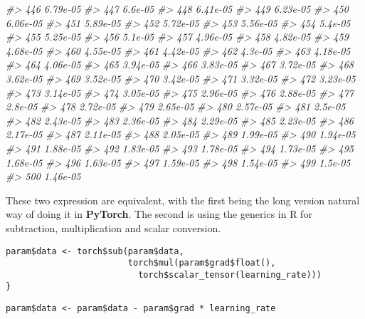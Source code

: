 \documentclass[]{book}
\newenvironment{Shaded}{\begin{snugshade}}{\end{snugshade}}
\newcommand{\CommentTok}[1]{\textcolor[rgb]{0.56,0.35,0.01}{\textit{#1}}}
\begin{document}
\begin{Shaded}
\begin{Highlighting}[]
\CommentTok{#> 446  6.79e-05 }
\CommentTok{#> 447  6.6e-05 }
\CommentTok{#> 448  6.41e-05 }
\CommentTok{#> 449  6.23e-05 }
\CommentTok{#> 450  6.06e-05 }
\CommentTok{#> 451  5.89e-05 }
\CommentTok{#> 452  5.72e-05 }
\CommentTok{#> 453  5.56e-05 }
\CommentTok{#> 454  5.4e-05 }
\CommentTok{#> 455  5.25e-05 }
\CommentTok{#> 456  5.1e-05 }
\CommentTok{#> 457  4.96e-05 }
\CommentTok{#> 458  4.82e-05 }
\CommentTok{#> 459  4.68e-05 }
\CommentTok{#> 460  4.55e-05 }
\CommentTok{#> 461  4.42e-05 }
\CommentTok{#> 462  4.3e-05 }
\CommentTok{#> 463  4.18e-05 }
\CommentTok{#> 464  4.06e-05 }
\CommentTok{#> 465  3.94e-05 }
\CommentTok{#> 466  3.83e-05 }
\CommentTok{#> 467  3.72e-05 }
\CommentTok{#> 468  3.62e-05 }
\CommentTok{#> 469  3.52e-05 }
\CommentTok{#> 470  3.42e-05 }
\CommentTok{#> 471  3.32e-05 }
\CommentTok{#> 472  3.23e-05 }
\CommentTok{#> 473  3.14e-05 }
\CommentTok{#> 474  3.05e-05 }
\CommentTok{#> 475  2.96e-05 }
\CommentTok{#> 476  2.88e-05 }
\CommentTok{#> 477  2.8e-05 }
\CommentTok{#> 478  2.72e-05 }
\CommentTok{#> 479  2.65e-05 }
\CommentTok{#> 480  2.57e-05 }
\CommentTok{#> 481  2.5e-05 }
\CommentTok{#> 482  2.43e-05 }
\CommentTok{#> 483  2.36e-05 }
\CommentTok{#> 484  2.29e-05 }
\CommentTok{#> 485  2.23e-05 }
\CommentTok{#> 486  2.17e-05 }
\CommentTok{#> 487  2.11e-05 }
\CommentTok{#> 488  2.05e-05 }
\CommentTok{#> 489  1.99e-05 }
\CommentTok{#> 490  1.94e-05 }
\CommentTok{#> 491  1.88e-05 }
\CommentTok{#> 492  1.83e-05 }
\CommentTok{#> 493  1.78e-05 }
\CommentTok{#> 494  1.73e-05 }
\CommentTok{#> 495  1.68e-05 }
\CommentTok{#> 496  1.63e-05 }
\CommentTok{#> 497  1.59e-05 }
\CommentTok{#> 498  1.54e-05 }
\CommentTok{#> 499  1.5e-05 }
\CommentTok{#> 500  1.46e-05}
\end{Highlighting}
\end{Shaded}

These two expression are equivalent, with the first being the long version natural way of doing it in \textbf{PyTorch}. The second is using the generics in R for subtraction, multiplication and scalar conversion.

\begin{verbatim}
param$data <- torch$sub(param$data,
                        torch$mul(param$grad$float(),
                          torch$scalar_tensor(learning_rate)))
}
\end{verbatim}

\begin{verbatim}
param$data <- param$data - param$grad * learning_rate
\end{verbatim}
\end{document}
